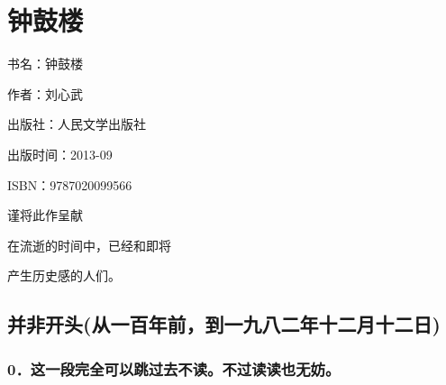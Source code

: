 


\section{钟鼓楼}


\par 书名：钟鼓楼
\par 作者：刘心武
\par 出版社：人民文学出版社
\par 出版时间：2013-09
\par ISBN：9787020099566


\begin{center}
\par 谨将此作呈献
\par 在流逝的时间中，已经和即将
\par 产生历史感的人们。
\end{center}



\subsection*{并非开头(从一百年前，到一九八二年十二月十二日)}

\subsubsection*{0．这一段完全可以跳过去不读。不过读读也无妨。}

